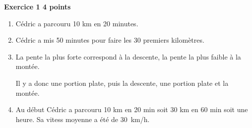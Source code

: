 \textbf{Exercice 1 \hfill 4 points}

\medskip

%
%
%
%
 
\begin{enumerate}
\item %
Cédric a parcouru 10 km en 20 minutes. 
\item %
Cédric a mis 50 minutes pour faire les 30 premiers kilomètres. 
\item %

La pente la plus forte correspond à la descente, la pente la plus faible à la montée. 

Il y a donc une portion plate, puis la descente, une portion plate et la montée. 
\item %
Au début Cédric a parcouru 10 km en 20 min soit 30 km en 60 min soit une heure. Sa vitess moyenne a été de 30~km/h. 
\end{enumerate}

\vspace{0,5cm}

